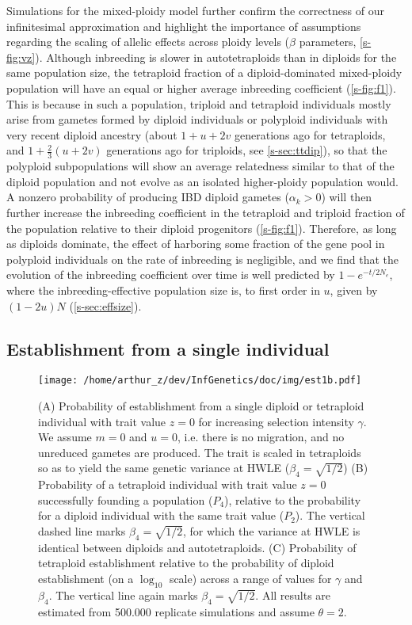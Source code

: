 \documentclass[12pt,a4paper]{article}
\begin{document}
Simulations for the mixed-ploidy model further confirm the correctness of our
infinitesimal approximation and highlight the importance of assumptions
regarding the scaling of allelic effects across ploidy levels
($\beta$ parameters, \cref{s-fig:vz}).
Although inbreeding is slower in autotetraploids than in diploids for the same
population size, the tetraploid fraction of a diploid-dominated mixed-ploidy 
population will have an equal or higher average inbreeding coefficient
(\cref{s-fig:f1}).
This is because in such a population, triploid and tetraploid individuals
mostly arise from gametes formed by diploid individuals or polyploid
individuals with very recent diploid ancestry (about $1+u+2v$ generations ago
for tetraploids, and $1+\frac{2}{3}(u+2v)$ generations ago for triploids, see
\cref{s-sec:ttdip}), so that the polyploid subpopulations will show an average
relatedness similar to that of the diploid population and not evolve as an
isolated higher-ploidy population would.
A nonzero probability of producing IBD diploid gametes ($\alpha_k > 0$) will
then further increase the inbreeding coefficient in the tetraploid and triploid
fraction of the population relative to their diploid progenitors
(\cref{s-fig:f1}).
Therefore, as long as diploids dominate, the effect of harboring some fraction
of the gene pool in polyploid individuals on the rate of inbreeding is
negligible, and we find that the evolution of the inbreeding coefficient over
time is well predicted by $1-e^{-t/2N_e}$, where the inbreeding-effective
population size is, to first order in $u$, given by $(1-2u)N$
(\cref{s-sec:effsize}). 


\subsection*{Establishment from a single individual}

\begin{figure}[t]
\centering
\texttt{[image: /home/arthur\_z/dev/InfGenetics/doc/img/est1b.pdf]}
\caption{
(A) Probability of establishment from a single diploid or tetraploid individual
with trait value $z=0$ for increasing selection intensity $\gamma$.
We assume $m=0$ and $u=0$, i.e. there is no migration, and no unreduced
gametes are produced. The trait is scaled in tetraploids so as to yield the
same genetic variance at HWLE ($\beta_4 = \sqrt{1/2}$)
(B) Probability of a tetraploid individual with trait value $z = 0$
successfully founding a population ($P_4$), relative to the probability for a
diploid individual with the same trait value ($P_2$).
The vertical dashed line marks $\beta_4=\sqrt{1/2}$, for which the variance at
HWLE is identical between diploids and autotetraploids.
(C) Probability of tetraploid establishment relative to the probability of
diploid establishment (on a $\log_{10}$ scale) across a range of values for
$\gamma$ and $\beta_4$. The vertical line again marks $\beta_4=\sqrt{1/2}$.
All results are estimated from 500.000 replicate simulations and assume
$\theta=2$.
\label{fig:est1}}
\end{figure}
\end{document}
